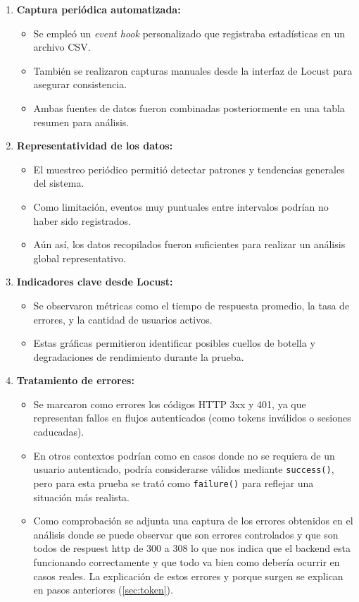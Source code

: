 \documentclass[10pt]{book}
\begin{document}
\begin{enumerate}
    \item \textbf{Captura periódica automatizada:}
    \begin{itemize}
        \item Se empleó un \textit{event hook} personalizado que registraba estadísticas en un archivo CSV.
        \item También se realizaron capturas manuales desde la interfaz de Locust para asegurar consistencia.
        \item Ambas fuentes de datos fueron combinadas posteriormente en una tabla resumen para análisis.
    \end{itemize}

    \item \textbf{Representatividad de los datos:}
    \begin{itemize}
        \item El muestreo periódico permitió detectar patrones y tendencias generales del sistema.
        \item Como limitación, eventos muy puntuales entre intervalos podrían no haber sido registrados.
        \item Aún así, los datos recopilados fueron suficientes para realizar un análisis global representativo.
    \end{itemize}

    \item \textbf{Indicadores clave desde Locust:}
    \begin{itemize}
        \item Se observaron métricas como el tiempo de respuesta promedio, la tasa de errores, y la cantidad de usuarios activos.
        \item Estas gráficas permitieron identificar posibles cuellos de botella y degradaciones de rendimiento durante la prueba.
    \end{itemize}

    \item \textbf{Tratamiento de errores:}
    \begin{itemize}
        \item Se marcaron como errores los códigos HTTP 3xx y 401, ya que representan fallos en flujos autenticados (como tokens inválidos o sesiones caducadas).
        \item En otros contextos podrían como en casos donde no se requiera de un usuario autenticado, podría considerarse válidos mediante \texttt{success()}, pero para esta prueba se trató como \texttt{failure()} para reflejar una situación más realista.
        \item Como comprobación se adjunta una captura de los errores obtenidos en el análisis donde se puede observar que son errores controlados y que son todos de respuest http de 300 a 308 lo que nos indica que el backend esta funcionando correctamente y que todo va bien como debería ocurrir en casos reales.
        La explicación de estos errores y porque surgen se explican en pasos anteriores (\autoref{sec:token}).
        


\end{itemize}
\end{enumerate}
\end{document}
